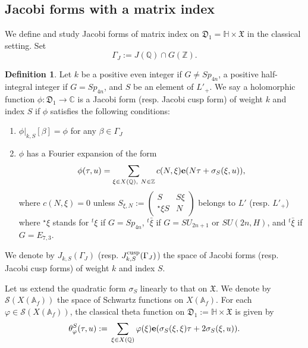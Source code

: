 \documentclass[11pt]{amsart}
\numberwithin{equation}{section}
\theoremstyle{definition}
\newtheorem{defin}[theorem]{Definition}
\begin{document}
\subsection{Jacobi forms with a matrix index}
We define and study Jacobi forms of matrix index on $\mathfrak{D}_1=\mathbb{H}\times \mathfrak{X}$ in the classical setting.
Set
$$\Gamma_J:=J({\mathbb{Q}})\cap G({\mathbb{Z}}).
$$

\begin{defin}\label{jacobi} Let $k$ be a positive even integer if $G\not=Sp_{4n}$, a
positive half-integral integer if $G=Sp_{4n}$, and $S$ be an element of $L'_+$.
We say a holomorphic function $\phi:\mathfrak{D}_1{\longrightarrow} {\mathbb{C}}$ is a Jacobi form (resp. Jacobi cusp form) of weight $k$ and index $S$ if
$\phi$ satisfies the following conditions:

\begin{enumerate}
\item $\phi|_{k,S}[\beta]=\phi$ for any $\beta\in \Gamma_J$
\item $\phi$ has a Fourier expansion of the form
$$\phi(\tau,u)=\sum_{\xi\in X({\mathbb{Q}}),\ N\in {\mathbb{Z}}}c(N,\xi)\bold{e}(N\tau+\sigma_S(\xi,u)),
$$
where $c(N,\xi)=0$ unless $S_{\xi,N}:=
\left(\begin{array}{cc}
S & S\xi \\
{}^\star \xi S & N
\end{array}\right)$ belongs to $L'$ (resp. $L'_{+}$) where ${}^\star \xi$ stands for ${}^t \xi$ if $G=Sp_{4n}$,
${}^t {\bar\xi}$ if $G=SU_{2n+1}$ or $SU(2n,H)$, and ${}^t \bar{\xi}$ if $G=E_{7,3}$.
\end{enumerate}
We denote by $J_{k,S}(\Gamma_J)$ (resp. $J^{{\rm cusp}}_{k,S}(\Gamma_J)$) the space of Jacobi forms
(resp. Jacobi cusp forms) of weight $k$ and index $S$.
\end{defin}
Let us extend the quadratic form $\sigma_S$ linearly to that on
$\mathfrak{X}$.
We denote by $ \mathcal{S}(X({\mathbb{A}}_f))$ the space of Schwartz functions on $X({\mathbb{A}}_f)$.
For each $\varphi \in \mathcal{S}(X({\mathbb{A}}_f))$,
the classical theta function on $\mathfrak{D}_1:=\mathbb{H}\times \mathfrak{X}$ is given by
$$\theta^S_\varphi(\tau,u):={\displaystyle}\sum_{\xi\in X({\mathbb{Q}})}\varphi(\xi)\bold{e}(\sigma_S(\xi,\xi)\tau+2\sigma_S(\xi,u)).$$
\end{document}

